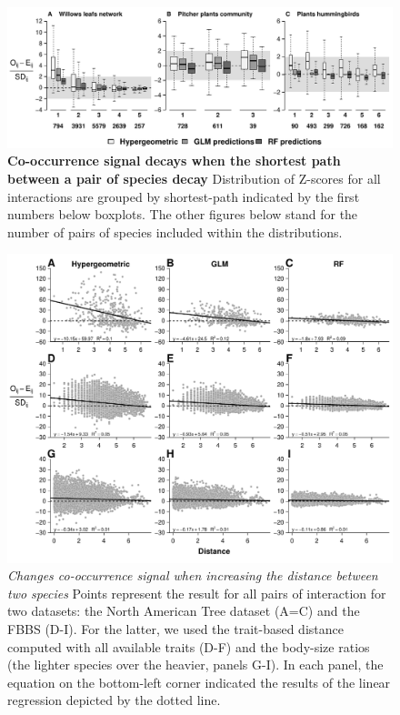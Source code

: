 \begin{figure}[htbp]
\centering
\includegraphics{chapitre3/figS5.pdf}
\caption{\textbf{Co-occurrence signal decays when the shortest path
between a pair of species decay} Distribution of Z-scores for all
interactions are grouped by shortest-path indicated by the first numbers
below boxplots. The other figures below stand for the number of pairs of
species included within the distributions.\label{fig:sht_pth2}}
\end{figure}

\newpage

\begin{figure}[htbp]
\centering
\includegraphics{chapitre3/figS6.pdf}
\caption{\emph{Changes co-occurrence signal when increasing the distance
between two species} Points represent the result for all pairs of
interaction for two datasets: the North American Tree dataset (A=C) and
the FBBS (D-I). For the latter, we used the trait-based distance
computed with all available traits (D-F) and the body-size ratios (the
lighter species over the heavier, panels G-I). In each panel, the
equation on the bottom-left corner indicated the results of the linear
regression depicted by the dotted line.\label{fig:distrev}}
\end{figure}

